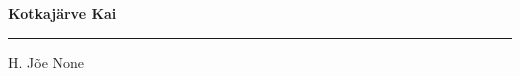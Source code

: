 \documentclass[10pt]{book}
\begin{document}
{
  \samepage
  \raggedbottom
  \raggedright
  \sloppy


  \vspace{0.2in}

  \noindent\begin{minipage}{.1\textwidth}
    \hfill\vspace{0.1in}
  \end{minipage}%
  \noindent\begin{minipage}{.8\textwidth}
    \centering
    \bfseries
    \large Kotkaj\"arve Kai
  \end{minipage}%
  \noindent\begin{minipage}{.1\textwidth}
      \hfill\vspace{0.1in}
  \end{minipage}

  \nopagebreak[4]
  \vspace{0.1in}
  \nopagebreak[4]
  \hrule height 0.05ex
  \nopagebreak[4]
  \vspace{-0.05in}

  {\footnotesize H. J\~oe \hfill None }\\
  \vspace{0.01in}



}
\end{document}
